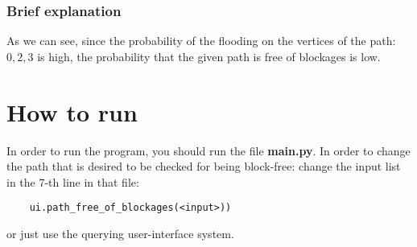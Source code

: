 \documentclass{article}                     %
\begin{document}
\subsubsection{Brief explanation}
As we can see, since the probability of the flooding on the vertices of the path: $0,2,3$ is high, the probability that the given path is free of blockages is low.

\section{How to run}
In order to run the program, you should run the file \textbf{main.py}. In order to change the path that is desired to be checked for being block-free: change the input list in the 7-th line in that file: \begin{verbatim}
    ui.path_free_of_blockages(<input>))
\end{verbatim}
or just use the querying user-interface system.
\end{document}
